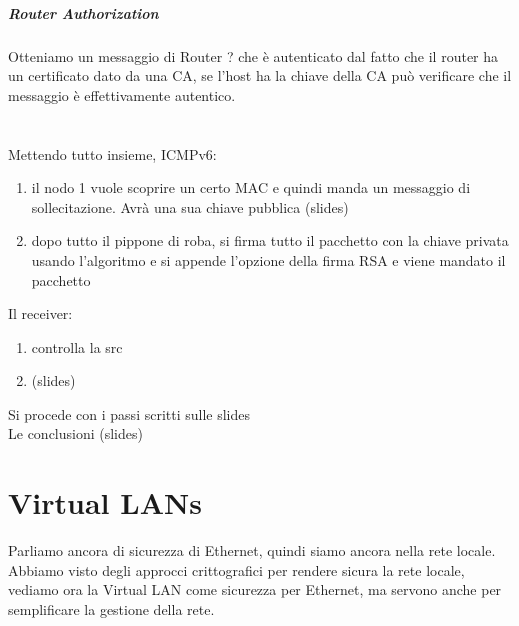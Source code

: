 \documentclass[12pt, oneside]{extbook} %
\begin{document}
\paragraph{Router Authorization}
Otteniamo un messaggio di Router ? che è autenticato dal fatto che il router ha un certificato dato da una CA, se l'host ha la chiave della CA può verificare che il messaggio è effettivamente autentico.\\\\
\\ Mettendo tutto insieme, ICMPv6:
\begin{enumerate}
\item il nodo 1 vuole scoprire un certo MAC e quindi manda un messaggio di sollecitazione. Avrà una sua chiave pubblica (slides)
\item dopo tutto il pippone di roba, si firma tutto il pacchetto con la chiave privata usando l'algoritmo e si appende l'opzione della firma RSA e viene mandato il pacchetto
\end{enumerate}
Il receiver:
\begin{enumerate}
\item controlla la src
\item (slides)
\end{enumerate}
Si procede con i passi scritti sulle slides\\ Le conclusioni (slides)
\chapter{Virtual LANs}
Parliamo ancora di sicurezza di Ethernet, quindi siamo ancora nella rete locale. Abbiamo visto degli approcci crittografici per rendere sicura la rete locale, vediamo ora la Virtual LAN come sicurezza per Ethernet, ma servono anche per semplificare la gestione della rete.
\end{document}
